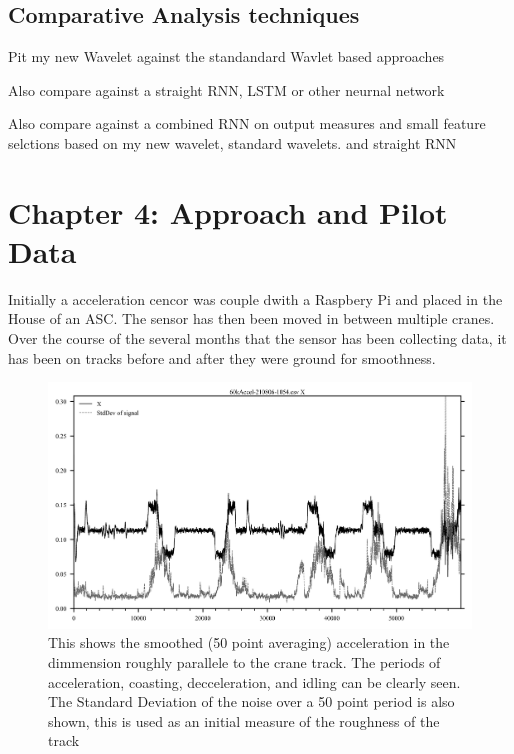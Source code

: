 \documentclass[journal=jacsat,manuscript=article]{achemso}
\begin{document}
\subsection{Comparative Analysis techniques}
Pit my new Wavelet against the standandard Wavlet based approaches

Also compare against a straight RNN, LSTM or other neurnal network

Also compare against a combined RNN on output measures and small feature selctions based on my new wavelet, standard wavelets. and straight RNN

\pagebreak
\section{Chapter 4: Approach and Pilot Data}

Initially a acceleration cencor was couple dwith a Raspbery Pi and placed in the House of an ASC.  The sensor has then been moved in between multiple cranes.  Over the course of the several months that the sensor has been collecting data, it has been on tracks before and after they were ground for smoothness.  

\begin{figure}
	\centering
	\includegraphics[width=0.7\linewidth]{"Figures/Average Smoothed Acceleration Curve"}
	\caption[Sample Acceleration]{This shows the smoothed (50 point averaging) acceleration in the dimmension roughly parallele to the crane track.  The periods of acceleration, coasting, decceleration, and idling can be clearly seen.  The Standard Deviation of the noise over a 50 point period is also shown, this is used as an initial measure of the roughness of the track}
	\label{fig:Sample-Acceleration-Curve}
\end{figure}
\end{document}

